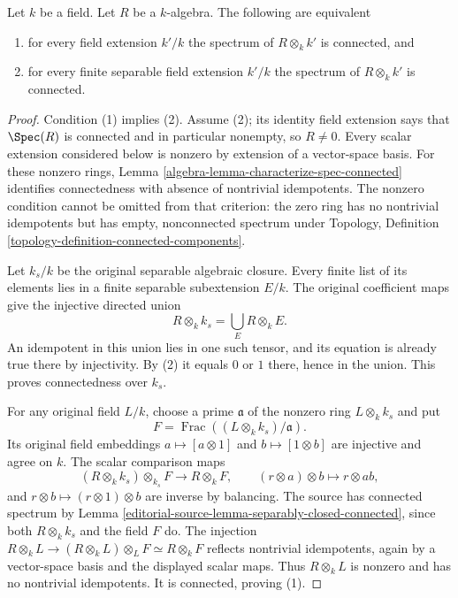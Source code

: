 \begin{lemma}
\label{editorial-source-lemma-geometrically-connected}
Let $k$ be a field.
Let $R$ be a $k$-algebra.
The following are equivalent
\begin{enumerate}
\item for every field extension $k'/k$ the
spectrum of $R \otimes_k k'$ is connected, and
\item for every finite separable field extension $k'/k$ the
spectrum of $R \otimes_k k'$ is connected.
\end{enumerate}
\end{lemma}

\begin{proof}
Condition (1) implies (2).
Assume (2); its identity field
extension says that $\Spec(R)$
is connected and in particular
nonempty, so $R\neq0$.
Every scalar extension considered
below is nonzero by extension
of a vector-space basis.
For these nonzero rings, Lemma
\ref{algebra-lemma-characterize-spec-connected}
identifies connectedness with
absence of nontrivial idempotents.
The nonzero condition cannot be
omitted from that criterion:
the zero ring has no nontrivial
idempotents but has empty,
nonconnected spectrum under
Topology, Definition
\ref{topology-definition-connected-components}.

Let $k_s/k$ be the original
separable algebraic closure.
Every finite list of its
elements lies in a finite
separable subextension $E/k$.
The original coefficient maps
give the injective directed union
$$
R\otimes_k k_s=\bigcup_E R\otimes_k E.
$$
An idempotent in this union
lies in one such tensor, and
its equation is already true
there by injectivity. By (2)
it equals $0$ or $1$ there,
hence in the union. This
proves connectedness over $k_s$.

For any original field $L/k$,
choose a prime $\mathfrak a$
of the nonzero ring $L\otimes_k k_s$
and put
$$
F=\operatorname{Frac}((L\otimes_k k_s)/\mathfrak a).
$$
Its original field embeddings
$a\mapsto[a\otimes1]$ and
$b\mapsto[1\otimes b]$ are
injective and agree on $k$.
The scalar comparison maps
$$
(R\otimes_k k_s)\otimes_{k_s}F\longrightarrow R\otimes_k F,
\qquad(r\otimes a)\otimes b\longmapsto r\otimes ab,
$$
and $r\otimes b\mapsto(r\otimes1)\otimes b$
are inverse by balancing.
The source has connected
spectrum by Lemma
\ref{editorial-source-lemma-separably-closed-connected},
since both $R\otimes_k k_s$
and the field $F$ do.
The injection
$R\otimes_k L\to(R\otimes_k L)\otimes_L F\simeq R\otimes_k F$
reflects nontrivial idempotents,
again by a vector-space basis
and the displayed scalar maps.
Thus $R\otimes_k L$ is nonzero
and has no nontrivial idempotents.
It is connected, proving (1).


\end{proof}
